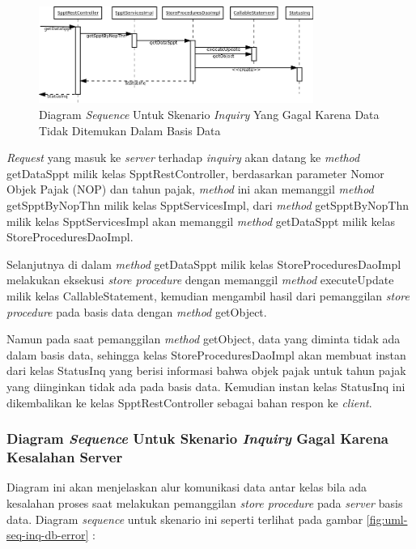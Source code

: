 \documentclass[pdftex,12pt, oneside]{article}
\begin{document}
\begin{figure}[H]
  \centering
  \includegraphics[width=0.8\textwidth]{./resources/uml/uml-seq-inq-not-any}
  \caption{Diagram \textit{Sequence} Untuk Skenario \textit{Inquiry} Yang Gagal Karena Data Tidak Ditemukan Dalam Basis Data}
  \label{fig:uml-seq-inq-not-any}
\end{figure}

\textit{Request} yang masuk ke \textit{server} terhadap \textit{inquiry} akan datang ke \textit{method} getDataSppt milik kelas SpptRestController, berdasarkan parameter Nomor Objek Pajak (NOP) dan tahun pajak, \textit{method} ini akan memanggil \textit{method} getSpptByNopThn milik kelas SpptServicesImpl, dari \textit{method} getSpptByNopThn milik kelas SpptServicesImpl akan memanggil \textit{method} getDataSppt milik kelas StoreProceduresDaoImpl.

Selanjutnya di dalam \textit{method} getDataSppt milik kelas StoreProceduresDaoImpl melakukan eksekusi \textit{store procedure} dengan memanggil \textit{method} executeUpdate milik kelas CallableStatement, kemudian mengambil hasil dari pemanggilan \textit{store procedure} pada basis data dengan \textit{method} getObject.

Namun pada saat pemanggilan \textit{method} getObject, data yang diminta tidak ada dalam basis data, sehingga kelas StoreProceduresDaoImpl akan membuat instan dari kelas StatusInq yang berisi informasi bahwa objek pajak untuk tahun pajak yang diinginkan tidak ada pada basis data. Kemudian instan kelas StatusInq ini dikembalikan ke kelas SpptRestController sebagai bahan respon ke \textit{client}.

\subsubsection{Diagram \textit{Sequence} Untuk Skenario \textit{Inquiry} Gagal Karena Kesalahan Server}

Diagram ini akan menjelaskan alur komunikasi data antar kelas bila ada kesalahan proses saat melakukan pemanggilan \textit{store procedure} pada \textit{server} basis data. Diagram \textit{sequence} untuk skenario ini seperti terlihat pada gambar \ref{fig:uml-seq-inq-db-error} :
\end{document}
